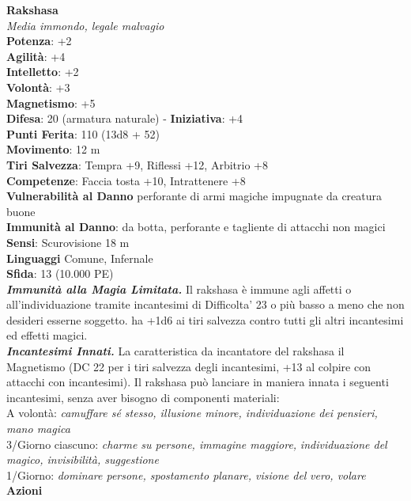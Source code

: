 \begin{multicols}{2}
\medskip\textbf{Rakshasa}\\
\emph{Media immondo, legale malvagio}\\
\textbf{Potenza}: +2\\
\textbf{Agilità}: +4\\
\textbf{Intelletto}: +2\\
\textbf{Volontà}: +3\\
\textbf{Magnetismo}: +5\\
\textbf{Difesa}: 20 (armatura naturale) - \textbf{Iniziativa}: +4\\
\textbf{Punti Ferita}: 110 (13d8 + 52)\\
\textbf{Movimento}: 12 m\\
\textbf{Tiri Salvezza}: Tempra +9, Riflessi +12, Arbitrio +8 \\
\textbf{Competenze}: Faccia tosta +10, Intrattenere +8\\
\textbf{Vulnerabilità al Danno} perforante di armi magiche impugnate da creatura buone\\
\textbf{Immunità al Danno}: da botta, perforante e tagliente di attacchi non magici\\
\textbf{Sensi}: Scurovisione 18 m\\
\textbf{Linguaggi} Comune, Infernale\\
\textbf{Sfida}: 13 (10.000 PE)\smallskip\\
\emph{\textbf{Immunità alla Magia Limitata.}} Il rakshasa è immune agli affetti o all'individuazione tramite incantesimi di Difficolta' 23 o più basso a meno che non desideri esserne soggetto. ha +1d6 ai tiri salvezza contro tutti gli altri incantesimi ed effetti magici.\\
\emph{\textbf{Incantesimi Innati.}} La caratteristica da incantatore del rakshasa il Magnetismo (DC  22 per i tiri salvezza degli incantesimi, +13 al colpire  con attacchi con incantesimi). Il rakshasa può lanciare in maniera  innata i seguenti incantesimi, senza aver bisogno di componenti  materiali:\\
A volontà: \emph{camuffare sé stesso, illusione minore, individuazione} \emph{dei pensieri, mano magica}\\
3/Giorno ciascuno: \emph{charme su persone, immagine maggiore,} \emph{individuazione del magico, invisibilità, suggestione}\\
1/Giorno: \emph{dominare persone, spostamento planare, visione del} \emph{vero, volare}\\
\smallskip\textbf{Azioni}\\

\end{multicols}
